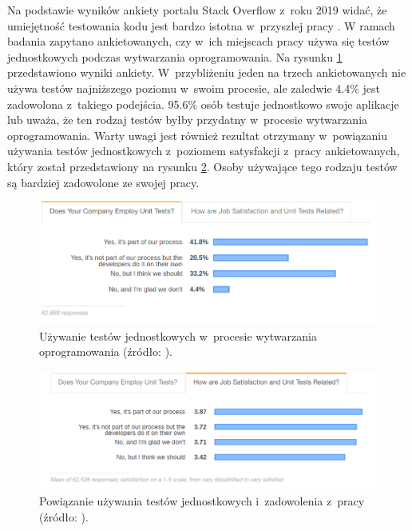 Na podstawie wyników ankiety portalu Stack Overflow z~roku 2019 widać, że umiejętność testowania kodu jest bardzo istotna w~przyszłej pracy \cite{stack-overflow-survey}.
W ramach badania zapytano ankietowanych, czy w~ich miejscach pracy używa się testów jednostkowych podczas wytwarzania oprogramowania.
Na rysunku \ref{fig:unit-tests-use} przedstawiono wyniki ankiety.
W~przybliżeniu jeden na trzech ankietowanych nie używa testów najniższego poziomu w~swoim procesie, ale zaledwie 4.4\% jest zadowolona z~takiego podejścia.
95.6\% osób testuje jednostkowo swoje aplikacje lub uważa, że ten rodzaj testów byłby przydatny w~procesie wytwarzania oprogramowania.
Warty uwagi jest również rezultat otrzymany w~powiązaniu używania testów jednostkowych z~poziomem satysfakcji z~pracy ankietowanych, który został przedstawiony na rysunku \ref{fig:unit-tests-satisfaction}.
Osoby używające tego rodzaju testów są bardziej zadowolone ze swojej pracy.

\begin{figure}[h]
    \centering
    \includegraphics[width = 13cm]{chapter02/unit-tests-use.png}
    \caption{Używanie testów jednostkowych w~procesie wytwarzania oprogramowania (źródło: \cite{stack-overflow-survey}).}
    \label{fig:unit-tests-use}
\end{figure}

\begin{figure}[h]
    \centering
    \includegraphics[width = 13cm]{chapter02/unit-tests-satisfaction.png}
    \caption{Powiązanie używania testów jednostkowych i~zadowolenia z~pracy (źródło: \cite{stack-overflow-survey}).}
    \label{fig:unit-tests-satisfaction}
\end{figure}

